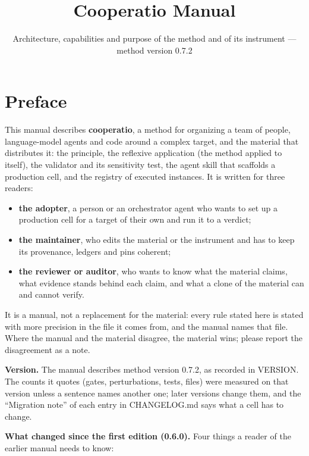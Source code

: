 \documentclass[
  american,
  10pt,
]{report}
\title{Cooperatio Manual}
\subtitle{Architecture, capabilities and purpose of the method and of
its instrument --- method version 0.7.2}
\author{}
\date{}
\providecommand{\tightlist}{%
  \setlength{\itemsep}{0pt}\setlength{\parskip}{0pt}}
\renewcommand{\texttt}[1]{{\ttfamily\hyphenchar\font=-1 #1}}
\begin{document}
\maketitle

{
\hypersetup{linkcolor=black}
\setcounter{tocdepth}{1}
\tableofcontents
}
\chapter*{Preface}\label{preface}

This manual describes \textbf{cooperatio}, a method for organizing a
team of people, language-model agents and code around a complex target,
and the material that distributes it: the principle, the reflexive
application (the method applied to itself), the validator and its
sensitivity test, the agent skill that scaffolds a production cell, and
the registry of executed instances. It is written for three readers:

\begin{itemize}
\tightlist
\item
  \textbf{the adopter}, a person or an orchestrator agent who wants to
  set up a production cell for a target of their own and run it to a
  verdict;
\item
  \textbf{the maintainer}, who edits the material or the instrument and
  has to keep its provenance, ledgers and pins coherent;
\item
  \textbf{the reviewer or auditor}, who wants to know what the material
  claims, what evidence stands behind each claim, and what a clone of
  the material can and cannot verify.
\end{itemize}

It is a manual, not a replacement for the material: every rule stated
here is stated with more precision in the file it comes from, and the
manual names that file. Where the manual and the material disagree, the
material wins; please report the disagreement as a note.

\textbf{Version.} The manual describes method version 0.7.2, as recorded
in \texttt{VERSION}. The counts it quotes (gates, perturbations, tests,
files) were measured on that version unless a sentence names another
one; later versions change them, and the ``Migration note'' of each
entry in \texttt{CHANGELOG.\allowbreak{}md} says what a cell has to
change.

\textbf{What changed since the first edition (0.6.0).} Four things a
reader of the earlier manual needs to know:
\end{document}
